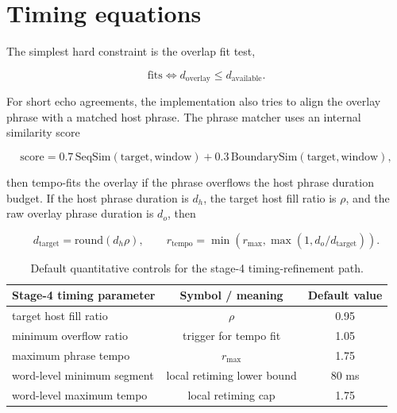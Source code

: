 \section{Timing equations}

The simplest hard constraint is the overlap fit test,

\begin{equation}
\text{fits} \iff d_{\mathrm{overlay}} \leq d_{\mathrm{available}}.
\end{equation}

For short echo agreements, the implementation also tries to align the overlay phrase with a matched host phrase. The phrase matcher uses an internal similarity score

\begin{equation}
\mathrm{score} = 0.7\,\mathrm{SeqSim}(\text{target}, \text{window}) + 0.3\,\mathrm{BoundarySim}(\text{target}, \text{window}),
\end{equation}

then tempo-fits the overlay if the phrase overflows the host phrase duration budget. If the host phrase duration is \(d_h\), the target host fill ratio is \(\rho\), and the raw overlay phrase duration is \(d_o\), then

\begin{equation}
d_{\mathrm{target}} = \mathrm{round}(d_h \rho), \qquad r_{\mathrm{tempo}} = \min(r_{\max}, \max(1, d_o / d_{\mathrm{target}})).
\end{equation}

\heuristicnote

\begin{table}[H]
\centering
\small
\begin{tabular}{lcc}
\toprule
Stage-4 timing parameter & Symbol / meaning & Default value \\
\midrule
target host fill ratio & \(\rho\) & 0.95 \\
minimum overflow ratio & trigger for tempo fit & 1.05 \\
maximum phrase tempo & \(r_{\max}\) & 1.75 \\
word-level minimum segment & local retiming lower bound & 80 ms \\
word-level maximum tempo & local retiming cap & 1.75 \\
\bottomrule
\end{tabular}
\caption{Default quantitative controls for the stage-4 timing-refinement path.}
\label{tab:stage4-config}
\end{table}

